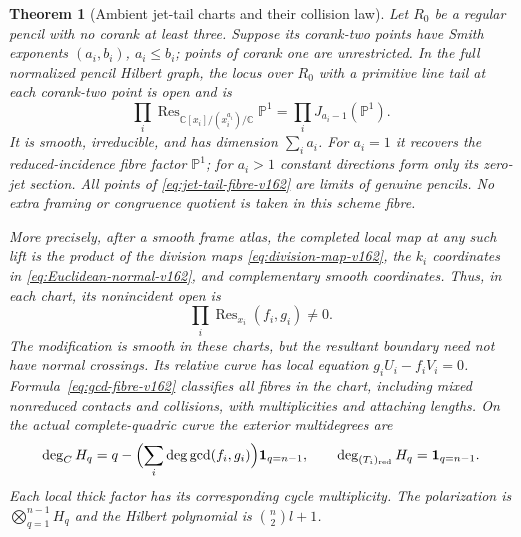 \documentclass[11pt,reqno]{amsart}
\numberwithin{equation}{section}
\newtheorem{theorem}{Theorem}[section]
\theoremstyle{definition}\newtheorem{definition}[theorem]{Definition}
\theoremstyle{remark}\newtheorem{remark}[theorem]{Remark}
\newcommand{\C}{\mathbb C}\newcommand{\Q}{\mathbb Q}
\newcommand{\Pj}{\mathbb P}\newcommand{\A}{\mathbb A}
\begin{document}
\begin{theorem}[Ambient jet-tail charts and their collision law]
\label{thm:ambient-jet-tails-v162}
Let $R_0$ be a regular pencil with no corank at least three. Suppose
its corank-two points have Smith exponents $(a_i,b_i)$, $a_i\leq b_i$;
points of corank one are unrestricted. In the full normalized pencil
Hilbert graph, the locus over $R_0$ with a primitive line tail at
each corank-two point is open and is
\begin{equation}\label{eq:jet-tail-fibre-v162}
 \prod_i\operatorname{Res}_{\C[x_i]/(x_i^{a_i})/\C}\Pj^1
                  =\prod_i J_{a_i-1}(\Pj^1).
\end{equation}
It is smooth, irreducible, and has dimension $\sum_i a_i$.
For $a_i=1$ it recovers the reduced-incidence fibre factor $\Pj^1$;
for $a_i>1$ constant directions form only its zero-jet section.
All points of \eqref{eq:jet-tail-fibre-v162} are limits of genuine
pencils. No extra framing or congruence quotient is taken in this
scheme fibre.

More precisely, after a smooth frame atlas, the completed local map
at any such lift is the product of the division maps
\eqref{eq:division-map-v162}, the $k_i$ coordinates in
\eqref{eq:Euclidean-normal-v162}, and complementary smooth
coordinates. Thus, in each chart, its nonincident open is
\begin{equation}\label{eq:resultant-boundary-v162}
                  \prod_i\operatorname{Res}_{x_i}(f_i,g_i)\ne0.
\end{equation}
The modification is smooth in these charts, but the resultant
boundary need not have normal crossings. Its relative curve has
local equation $g_iU_i-f_iV_i=0$. Formula~\eqref{eq:gcd-fibre-v162}
classifies all fibres in the chart, including mixed nonreduced
contacts and collisions, with multiplicities and attaching lengths.
On the actual complete-quadric curve the exterior multidegrees are
\begin{equation}\label{eq:jet-degrees-v162}
 \deg_C H_q=q-\Bigl(\sum_i\deg\gcd(f_i,g_i)\Bigr)
                   \mathbf1_{q=n-1},\qquad
 \deg_{(T_i)_{\rm red}}H_q=\mathbf1_{q=n-1}.
\end{equation}
Each local thick factor has its corresponding cycle multiplicity.
The polarization is $\bigotimes_{q=1}^{n-1}H_q$ and the Hilbert
polynomial is $\binom n2l+1$.
\end{theorem}
\end{document}

